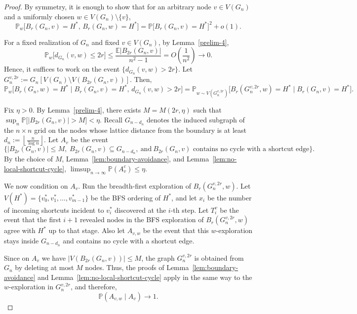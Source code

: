 \documentclass[10pt]{amsart}
\begin{document}
\begin{proof}
By symmetry, it is enough to show that for an arbitrary node \(v\in V(G_n)\) and a uniformly chosen
\(w\in V(G_n)\setminus\{v\}\),
\[
\mathbb P_w\bigl[B_r(G_n,v)=H^*,\,B_r(G_n,w)=H^*\bigr]
=
\mathbb P\bigl[B_r(G_n,v)=H^*\bigr]^2+o(1).
\]

For a fixed realization of \(G_n\) and fixed \(v\in V(G_n)\), by Lemma~\ref{prelim-4},
\[
\mathbb P_w\bigl[d_{G_n}(v,w)\le 2r\bigr]
\le
\frac{\mathbb E|B_{2r}(G_n,v)|}{n^2-1}
=
O\!\left(\frac1{n^2}\right)\to 0.
\]
Hence, it suffices to work on the event \( \{d_{G_n}(v,w)>2r\} \). Let \(G_n^{v,2r}:=G_n[V(G_n)\setminus V(B_{2r}(G_n,v))]\). Then,
\[
\mathbb P_w\bigl[B_r(G_n,w)=H^* \mid B_r(G_n,v)=H^*,\,d_{G_n}(v,w)>2r\bigr]
=
\mathbb P_{w\sim V(G_n^{v,2r})}\bigl[B_r(G_n^{v,2r},w)=H^* \mid B_r(G_n,v)=H^*\bigr].
\]

Fix \(\eta>0\). By Lemma~\ref{prelim-4}, there exists \(M=M(2r,\eta)\) such that
\(
\sup_n \mathbb P\bigl[|B_{2r}(G_n,v)|>M\bigr]<\eta.
\)
Recall \(G_{n-d_n}\) denotes the induced subgraph of the \(n\times n\) grid on the nodes whose lattice distance from the boundary is at least \(d_n := \left\lfloor \frac{n}{\log n}\right\rfloor
\).  Let \(A_v\) be the event
\[
\bigl\{ |B_{2r}(G_n,v)|\le M,\;
B_{2r}(G_n,v)\subseteq G_{n-d_n},
\ \text{and}\
B_{2r}(G_n,v)\text{ contains no cycle with a shortcut edge}\bigr\}.
\]
By the choice of \(M\), Lemma~\ref{lem:boundary-avoidance}, and Lemma~\ref{lem:no-local-shortcut-cycle},
\(
\limsup_{n\to\infty}\mathbb P(A_v^c)\le \eta .
\)

We now condition on \(A_v\). Run the breadth-first exploration of \(B_r(G_n^{v,2r},w)\). Let
\(V(H^*)=\{v_0^*,v_1^*,\dots,v_{m-1}^*\}\)
be the BFS ordering of \(H^*\), and let \(x_i\) be the number of incoming shortcuts incident to \(v_i^*\) discovered
at the \(i\)-th step. Let \(T_i^v\) be the event that the first \(i+1\) revealed nodes in the BFS exploration of
\(B_r(G_n^{v,2r},w)\) agree with \(H^*\) up to that stage. Also let \(A_{v,w}\) be the event that this \(w\)-exploration
stays inside \(G_{n-d_n}\) and contains no cycle with a shortcut edge.

Since on \(A_v\) we have \(|V(B_{2r}(G_n,v))|\le M\), the graph \(G_n^{v,2r}\) is obtained from \(G_n\) by deleting at most \(M\) nodes.
Thus, the proofs of Lemma~\ref{lem:boundary-avoidance} and Lemma~\ref{lem:no-local-shortcut-cycle} apply in the same way to the
\(w\)-exploration in \(G_n^{v,2r}\), and therefore,
\[
\mathbb P(A_{v,w}\mid A_v)\to 1.
\]


\end{proof}
\end{document}
